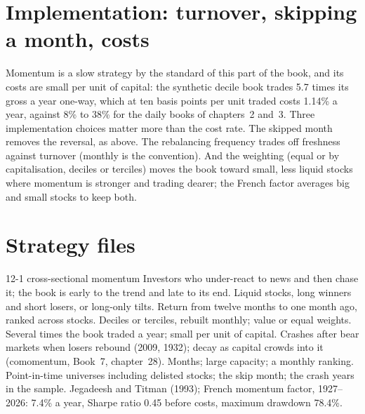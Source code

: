 \section{Implementation: turnover, skipping a month, costs}

Momentum is a slow strategy by the standard of this part of the book, and its costs are small per unit of capital: the synthetic decile book trades 5.7 times
its gross a year one-way, which at ten basis points per unit traded costs 1.14\% a year, against 8\% to 38\% for the daily books of chapters~2 and~3. Three
implementation choices matter more than the cost rate. The skipped month removes the reversal, as above. The rebalancing frequency trades off freshness
against turnover (monthly is the convention). And the weighting (equal or by capitalisation, deciles or terciles) moves the book toward small, less liquid
stocks where momentum is stronger and trading dearer; the French factor averages big and small stocks to keep both.

\section{Strategy files}

\begin{strategyfile}{12-1 cross-sectional momentum}\label{strat:s1:momentum:classic}
 Investors who under-react to news and then chase it; the book is early to the trend and late to its end.
 Liquid stocks, long winners and short losers, or long-only tilts.
 Return from twelve months to one month ago, ranked across stocks.
 Deciles or terciles, rebuilt monthly; value or equal weights.
 Several times the book traded a year; small per unit of capital.
 Crashes after bear markets when losers rebound (2009, 1932); decay as capital crowds into it (comomentum, Book~7, chapter~28).
 Months; large capacity; a monthly ranking.
 Point-in-time universes including delisted stocks; the skip month; the crash years in the sample.
 Jegadeesh and Titman (1993); French momentum factor, 1927--2026: 7.4\% a year, Sharpe ratio 0.45 before costs, maximum drawdown 78.4\%.
\end{strategyfile}


